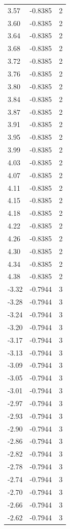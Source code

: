 \begin{longtable}{lrr}
  3.57 & -0.8385 & 2 \\
  3.60 & -0.8385 & 2 \\
  3.64 & -0.8385 & 2 \\
  3.68 & -0.8385 & 2 \\
  3.72 & -0.8385 & 2 \\
  3.76 & -0.8385 & 2 \\
  3.80 & -0.8385 & 2 \\
  3.84 & -0.8385 & 2 \\
  3.87 & -0.8385 & 2 \\
  3.91 & -0.8385 & 2 \\
  3.95 & -0.8385 & 2 \\
  3.99 & -0.8385 & 2 \\
  4.03 & -0.8385 & 2 \\
  4.07 & -0.8385 & 2 \\
  4.11 & -0.8385 & 2 \\
  4.15 & -0.8385 & 2 \\
  4.18 & -0.8385 & 2 \\
  4.22 & -0.8385 & 2 \\
  4.26 & -0.8385 & 2 \\
  4.30 & -0.8385 & 2 \\
  4.34 & -0.8385 & 2 \\
  4.38 & -0.8385 & 2 \\
  -3.32 & -0.7944 & 3 \\
  -3.28 & -0.7944 & 3 \\
  -3.24 & -0.7944 & 3 \\
  -3.20 & -0.7944 & 3 \\
  -3.17 & -0.7944 & 3 \\
  -3.13 & -0.7944 & 3 \\
  -3.09 & -0.7944 & 3 \\
  -3.05 & -0.7944 & 3 \\
  -3.01 & -0.7944 & 3 \\
  -2.97 & -0.7944 & 3 \\
  -2.93 & -0.7944 & 3 \\
  -2.90 & -0.7944 & 3 \\
  -2.86 & -0.7944 & 3 \\
  -2.82 & -0.7944 & 3 \\
  -2.78 & -0.7944 & 3 \\
  -2.74 & -0.7944 & 3 \\
  -2.70 & -0.7944 & 3 \\
  -2.66 & -0.7944 & 3 \\
  -2.62 & -0.7944 & 3 \\

\end{longtable}
